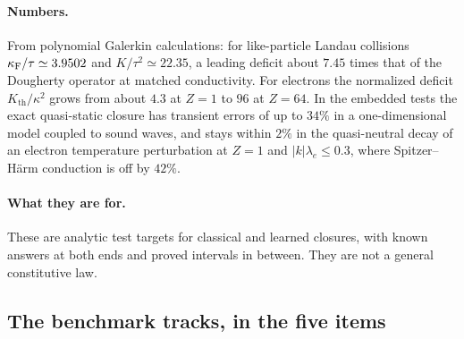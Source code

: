 \paragraph{Numbers.} From polynomial Galerkin calculations: for
like-particle Landau collisions $\kappa_{\mathrm F}/\tau\simeq3.9502$ and
$K/\tau^2\simeq22.35$, a leading deficit about $7.45$ times that of the
Dougherty operator at matched conductivity. For electrons the normalized
deficit $K_{\mathrm{th}}/\kappa^2$ grows from about $4.3$ at $Z=1$ to $96$
at $Z=64$. In the embedded tests the exact quasi-static closure has
transient errors of up to $34\%$ in a one-dimensional model coupled to
sound waves, and stays within $2\%$ in the quasi-neutral decay of an
electron temperature perturbation at $Z=1$ and $|k|\lambda_e\le0.3$, where
Spitzer--H\"arm conduction is off by $42\%$.

\paragraph{What they are for.} These are analytic test targets for
classical and learned closures, with known answers at both ends and proved
intervals in between. They are not a general constitutive law.

\subsection{The benchmark tracks, in the five items}

